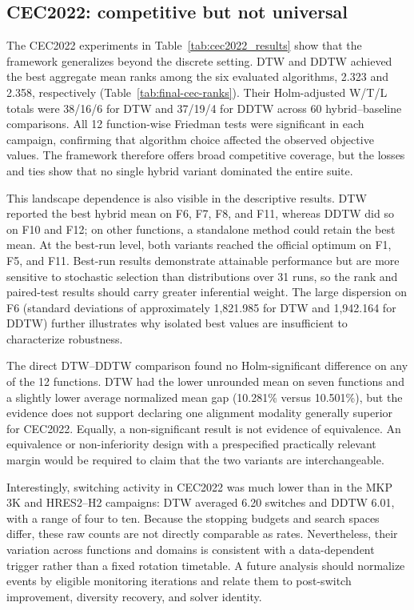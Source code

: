 \documentclass[review]{elsarticle}
\begin{document}
\subsection{CEC2022: competitive but not universal}
\label{sec:discussion-cec2022}

The CEC2022 experiments in Table~\ref{tab:cec2022_results} show that the
framework generalizes beyond the discrete setting. DTW and DDTW achieved the
best aggregate mean ranks among the six evaluated algorithms, 2.323 and 2.358,
respectively (Table~\ref{tab:final-cec-ranks}). Their Holm-adjusted W/T/L
totals were 38/16/6 for DTW and 37/19/4 for DDTW across 60
hybrid--baseline comparisons. All 12 function-wise Friedman tests were
significant in each campaign, confirming that algorithm choice affected the
observed objective values. The framework therefore offers broad competitive
coverage, but the losses and ties show that no single hybrid variant dominated
the entire suite.

This landscape dependence is also visible in the descriptive results. DTW
reported the best hybrid mean on F6, F7, F8, and F11, whereas DDTW did so on
F10 and F12; on other functions, a standalone method could retain the best
mean. At the best-run level, both variants reached the official optimum on F1,
F5, and F11. Best-run results demonstrate attainable performance but are more
sensitive to stochastic selection than distributions over 31 runs, so the
rank and paired-test results should carry greater inferential weight. The large
dispersion on F6 (standard deviations of approximately 1,821.985 for DTW and
1,942.164 for DDTW) further illustrates why isolated best values are
insufficient to characterize robustness.

The direct DTW--DDTW comparison found no Holm-significant difference on any of
the 12 functions. DTW had the lower unrounded mean on seven functions and a
slightly lower average normalized mean gap (10.281\% versus 10.501\%), but the
evidence does not support declaring one alignment modality generally superior
for CEC2022. Equally, a non-significant result is not evidence of equivalence.
An equivalence or non-inferiority design with a prespecified practically
relevant margin would be required to claim that the two variants are
interchangeable.

Interestingly, switching activity in CEC2022 was much lower than in the MKP
3K and HRES2--H2 campaigns: DTW averaged 6.20 switches and DDTW 6.01, with a
range of four to ten. Because the stopping budgets and search spaces differ,
these raw counts are not directly comparable as rates. Nevertheless, their
variation across functions and domains is consistent with a data-dependent
trigger rather than a fixed rotation timetable. A future analysis should
normalize events by eligible monitoring iterations and relate them to
post-switch improvement, diversity recovery, and solver identity.
\end{document}
